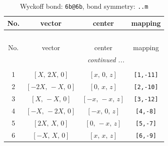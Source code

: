 \documentclass[fleqn,8pt]{jsarticle}
\begin{document}
\begin{longtable}{cccc}
\caption{Wyckoff bond: {\tt 6b@6b}, bond symmetry: {\tt ..m}}
 \\
 \hline \hline
No. & vector & center & mapping \\ \hline \endfirsthead

\multicolumn{3}{l}{\tablename\ \thetable{}} \\
 \hline \hline
No. & vector & center & mapping \\ \hline \endhead

 \hline \hline
\multicolumn{3}{r}{\footnotesize\it continued ...} \\ \endfoot

 \hline \hline
\multicolumn{3}{r}{} \\ \endlastfoot

1 & $\left[ X,\, 2 X,\, 0 \right]$ & $\left[ x,\, 0,\, z \right]$ & {\tt [1,-11]} \\ \hline
2 & $\left[ - 2 X,\, - X,\, 0 \right]$ & $\left[ 0,\, x,\, z \right]$ & {\tt [2,-10]} \\ \hline
3 & $\left[ X,\, - X,\, 0 \right]$ & $\left[ - x,\, - x,\, z \right]$ & {\tt [3,-12]} \\ \hline
4 & $\left[ - X,\, - 2 X,\, 0 \right]$ & $\left[ - x,\, 0,\, z \right]$ & {\tt [4,-8]} \\ \hline
5 & $\left[ 2 X,\, X,\, 0 \right]$ & $\left[ 0,\, - x,\, z \right]$ & {\tt [5,-7]} \\ \hline
6 & $\left[ - X,\, X,\, 0 \right]$ & $\left[ x,\, x,\, z \right]$ & {\tt [6,-9]} \\
\end{longtable}
\renewcommand{\arraystretch}{1.2}
\end{document}
